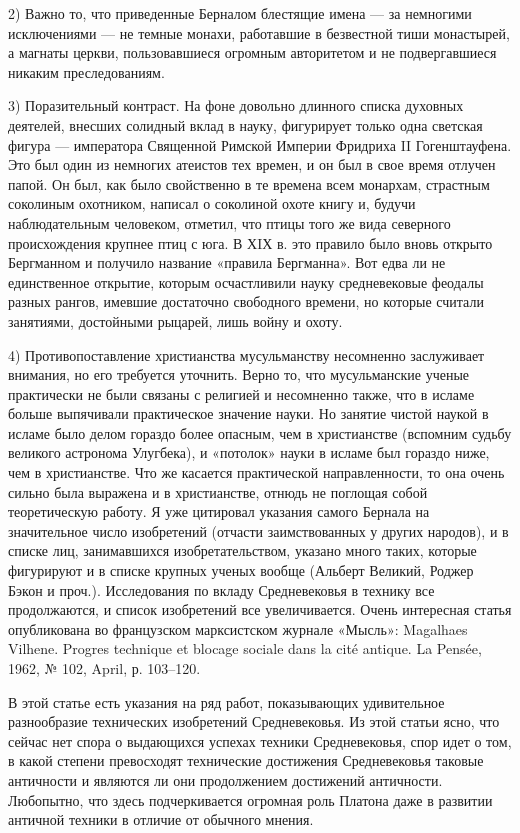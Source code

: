 2) Важно то, что приведенные Берналом блестящие имена --- за немногими
исключениями  ---  не  темные  монахи, работавшие  в  безвестной  тиши
монастырей, а магнаты церкви, пользовавшиеся огромным авторитетом и не
подвергавшиеся никаким преследованиям.

3) Поразительный  контраст. На фоне довольно  длинного списка духовных
деятелей,  внесших  солидный вклад  в  науку,  фигурирует только  одна
светская фигура  --- императора Священной Римской  Империи Фридриха II
Гогенштауфена. Это был один из немногих  атеистов тех времен, и он был
в свое время отлучен папой. Он  был, как было свойственно в те времена
всем  монархам, страстным  соколиным  охотником,  написал о  соколиной
охоте  книгу и,  будучи наблюдательным  человеком, отметил,  что птицы
того же вида северного происхождения крупнее  птиц с юга. В ХIХ в. это
правило  было вновь  открыто Бергманном  и получило  название «правила
Бергманна». Вот едва ли не единственное открытие, которым осчастливили
науку   средневековые  феодалы   разных  рангов,   имевшие  достаточно
свободного времени, но которые  считали занятиями, достойными рыцарей,
лишь войну и охоту.

4)    Противопоставление    христианства   мусульманству    несомненно
заслуживает  внимания,  но  его  требуется  уточнить.  Верно  то,  что
мусульманские  ученые  практически  не   были  связаны  с  религией  и
несомненно также, что в исламе больше выпячивали практическое значение
науки.  Но занятие  чистой наукой  в исламе  было делом  гораздо более
опасным,  чем  в  христианстве  (вспомним  судьбу  великого  астронома
Улугбека),  и  «потолок»  науки  в  исламе был  гораздо  ниже,  чем  в
христианстве.  Что же  касается  практической  направленности, то  она
очень  сильно  была выражена  и  в  христианстве, отнюдь  не  поглощая
собой теоретическую  работу. Я  уже цитировал указания  самого Бернала
на  значительное число  изобретений (отчасти  заимствованных у  других
народов),  и в  списке  лиц,  занимавшихся изобретательством,  указано
много  таких, которые  фигурируют  и в  списке  крупных ученых  вообще
(Альберт  Великий,  Роджер  Бэкон  и проч.).  Исследования  по  вкладу
Средневековья  в технику  все продолжаются,  и список  изобретений все
увеличивается.  Очень интересная  статья  опубликована во  французском
марксистском журнале «Мысль»: Magalhaes  Vilhene. Progres technique et
blocage sociale dans la cit\'{e}  antique. La Pens\'{e}e, 1962, № 102,
April, р. 103--120.

В этой  статье есть указания  на ряд работ,  показывающих удивительное
разнообразие  технических изобретений  Средневековья.  Из этой  статьи
ясно, что сейчас нет спора о выдающихся успехах техники Средневековья,
спор идет  о том, в  какой степени превосходят  технические достижения
Средневековья  таковые  античности  и  являются  ли  они  продолжением
достижений  античности. Любопытно,  что здесь  подчеркивается огромная
роль Платона  даже в развитии  античной техники в отличие  от обычного
мнения.

